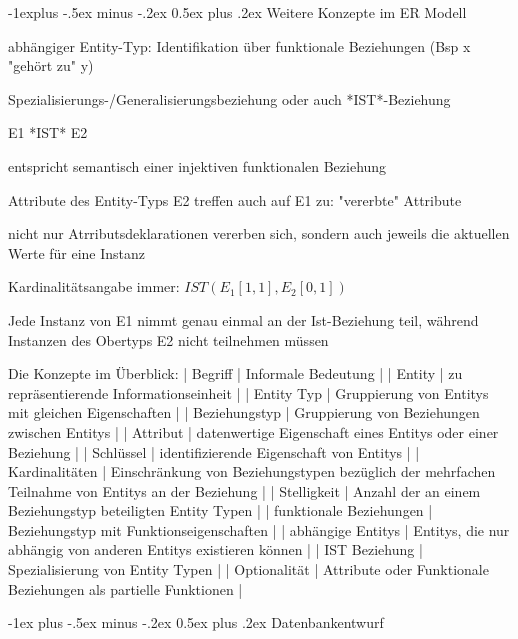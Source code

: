 \documentclass[a4paper]{article}
\makeatletter
\renewcommand{\section}{\@startsection{section}{1}{0mm}%
                                {-1ex plus -.5ex minus -.2ex}%
                                {0.5ex plus .2ex}%
                                {\normalfont\large\bfseries}}
\renewcommand{\subsection}{\@startsection{subsection}{2}{0mm}%
                                {-1explus -.5ex minus -.2ex}%
                                {0.5ex plus .2ex}%
                                {\normalfont\normalsize\bfseries}}
\makeatother
\begin{document}
\begin{multicols}{3}
\subsection{Weitere Konzepte im ER Modell}
\begin{itemize*}
    \item abhängiger Entity-Typ: Identifikation über funktionale Beziehungen (Bsp x "gehört zu" y)
    \item Spezialisierungs-/Generalisierungsbeziehung oder auch *IST*-Beziehung
    \begin{itemize*}
        \item E1 *IST* E2
        \item entspricht semantisch einer injektiven funktionalen Beziehung
        \item Attribute des Entity-Typs E2 treffen auch auf E1 zu: "vererbte" Attribute
        \item nicht nur Atrributsdeklarationen vererben sich, sondern auch jeweils die aktuellen Werte für eine Instanz
        \item Kardinalitätsangabe immer: $IST(E_1[1,1], E_2[0,1])$
        \item Jede Instanz von E1 nimmt genau einmal an der Ist-Beziehung teil, während Instanzen des Obertyps E2 nicht teilnehmen müssen
    \end{itemize*}
\end{itemize*}

Die Konzepte im Überblick:
| Begriff | Informale Bedeutung |
| Entity | zu repräsentierende Informationseinheit |
| Entity Typ | Gruppierung von Entitys mit gleichen Eigenschaften |
| Beziehungstyp | Gruppierung von Beziehungen zwischen Entitys |
| Attribut | datenwertige Eigenschaft eines Entitys oder einer Beziehung |
| Schlüssel | identifizierende Eigenschaft von Entitys |
| Kardinalitäten | Einschränkung von Beziehungstypen bezüglich der mehrfachen Teilnahme von Entitys an der Beziehung |
| Stelligkeit | Anzahl der an einem Beziehungstyp beteiligten Entity Typen |
| funktionale Beziehungen | Beziehungstyp mit Funktionseigenschaften |
| abhängige Entitys | Entitys, die nur abhängig von anderen Entitys existieren können |
| IST Beziehung | Spezialisierung von Entity Typen |
| Optionalität | Attribute oder Funktionale Beziehungen als partielle Funktionen |


\section{Datenbankentwurf}

\end{multicols}
\end{document}
